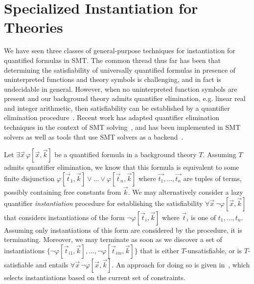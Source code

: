 \documentclass[oribibl]{llncs}
\begin{document}
\section{Specialized Instantiation for Theories}
\label{sec:cegqi}

We have seen three classes of general-purpose techniques 
for instantiation for quantified formulas in SMT.
The common thread thus far has been that determining the satisfiability of universally quantified formulas in presence
of uninterpreted functions and theory symbols is challenging, and in fact is undecidable in general.
However, when no uninterpreted function symbols are present and our background theory admits quantifier elimination, 
e.g. linear real and integer arithmetic, then satisfiability 
can be established by a quantifier elimination procedure~\cite{cooper1972,FerranteRackoff79ComputationalComplexityLogicalTheories,Loos93applyinglinear}.
Recent work has adapted quantifier elimination techniques in the context of SMT solving~\cite{monniaux2010quantifier,ReynoldsDKBT15Cav,DBLP:conf/lpar/BjornerJ15},
and has been implemented in SMT solvers
as well as tools that use SMT solvers as a backend~\cite{komuravelli2014smt,DBLP:conf/lpar/FedyukovichGS15}.

Let $\exists \vec x\, \varphi[ \vec x, \vec k ]$ be a quantified formula in a background theory $T$.
Assuming $T$ admits quantifier elimination, we know that this formula is equivalent to some finite disjunction
$\varphi[ \vec t_1, \vec k ] \vee \ldots \vee \varphi[ \vec t_n, \vec k ]$ where $\vec{t_1}, \ldots, \vec{t_n}$ are tuples of terms, possibly containing free constants from $\vec k$.
We may alternatively consider a lazy quantifier \emph{instantiation} procedure for establishing the satisfiability 
$\forall \vec x\, \neg \varphi[ \vec x, \vec k ]$ that considers instantiations of the form 
$\neg \varphi[ \vec t_i, \vec k ]$ where $\vec t_i$ is one of $t_1, \ldots, t_n$.
Assuming only instantiations of this form are considered by the procedure, it is terminating.
Moreover, we may terminate as soon as we discover a set of instantiations 
$\{ \neg \varphi[ \vec t_{i1}, \vec k ], \ldots, \neg \varphi[ \vec t_{im}, \vec k ] \}$ that is either
$T$-unsatisfiable, or is $T$-satisfiable and entails $\forall \vec x\, \neg \varphi[ \vec x, \vec k ]$.
An approach for doing so is given in~\cite{InstLA2016}, which selects instantiations based on the current set of constraints.
\begin{example}

\end{example}
\end{document}
